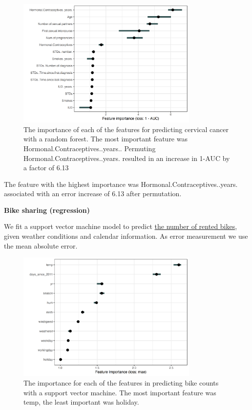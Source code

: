 \documentclass[
  11pt,
]{scrbook}
\begin{document}
\begin{figure}

{\centering \includegraphics[width=0.8\textwidth]{images/importance-cervical-1} 

}

\caption{The importance of each of the features for predicting cervical cancer with a random forest. The most important feature was Hormonal.Contraceptives..years.. Permuting Hormonal.Contraceptives..years. resulted in an increase in 1-AUC by a factor of 6.13}\label{fig:importance-cervical}
\end{figure}

The feature with the highest importance was Hormonal.Contraceptives..years. associated with an error increase of 6.13 after permutation.

\textbf{Bike sharing (regression)}

We fit a support vector machine model to predict \protect\hyperlink{bike-data}{the number of rented bikes}, given weather conditions and calendar information.
As error measurement we use the mean absolute error.

\begin{figure}

{\centering \includegraphics[width=0.8\textwidth]{images/importance-bike-1} 

}

\caption{The importance for each of the features in predicting bike counts with a support vector machine. The most important feature was temp, the least important was holiday.}\label{fig:importance-bike}
\end{figure}
\end{document}
